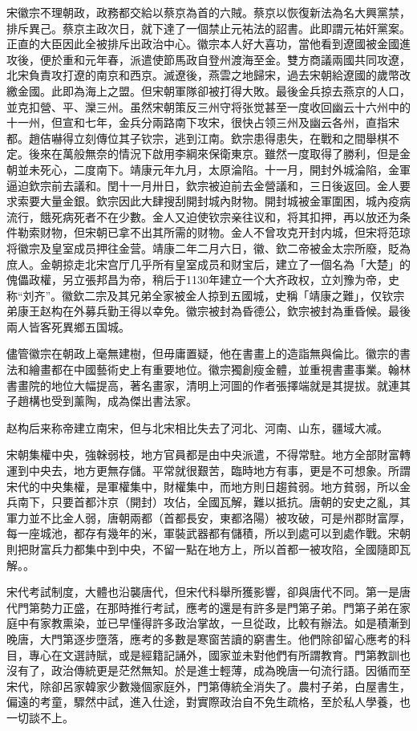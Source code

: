 宋徽宗不理朝政，政務都交給以蔡京為首的六賊。蔡京以恢復新法為名大興黨禁，排斥異己。蔡京主政次日，就下達了一個禁止元祐法的詔書。此即謂元祐奸黨案。正直的大臣因此全被排斥出政治中心。徽宗本人好大喜功，當他看到遼國被金國進攻後，便於重和元年春，派遣使節馬政自登州渡海至金。雙方商議兩國共同攻遼，北宋負責攻打遼的南京和西京。滅遼後，燕雲之地歸宋，過去宋朝給遼國的歲幣改繳金國。此即為海上之盟。但宋朝軍隊卻被打得大敗。最後金兵掠去燕京的人口，並克扣營、平、灤三州。虽然宋朝策反三州守将张觉甚至一度收回幽云十六州中的十一州，但宣和七年，金兵分兩路南下攻宋，很快占领三州及幽云各州，直指宋都。趙佶嚇得立刻傳位其子钦宗，逃到江南。欽宗患得患失，在戰和之間舉棋不定。後來在萬般無奈的情況下啟用李綱來保衛東京。雖然一度取得了勝利，但是金朝並未死心，二度南下。靖康元年九月，太原淪陷。十一月，開封外城淪陷，金軍逼迫欽宗前去議和。閏十一月卅日，欽宗被迫前去金營議和，三日後返回。金人要求索要大量金銀。欽宗因此大肆搜刮開封城內財物。開封城被金軍圍困，城內疫病流行，餓死病死者不在少數。金人又迫使钦宗亲往议和，将其扣押，再以放还为条件勒索财物，但宋朝已拿不出其所需的财物。金人不曾攻克开封内城，但宋将范琼将徽宗及皇室成员押往金营。靖康二年二月六日，徽、欽二帝被金太宗所廢，貶為庶人。金朝掠走北宋宫厅几乎所有皇室成员和财宝后，建立了一個名為「大楚」的傀儡政權，另立張邦昌为帝，稍后于1130年建立一个大齐政权，立刘豫为帝，史称“刘齐”。徽欽二宗及其兄弟全家被金人掠到五國城，史稱「靖康之難」，仅钦宗弟康王赵构在外募兵勤王得以幸免。徽宗被封為昏德公，欽宗被封為重昏候。最後兩人皆客死異鄉五国城。

儘管徽宗在朝政上毫無建樹，但毋庸置疑，他在書畫上的造詣無與倫比。徽宗的書法和繪畫都在中國藝術史上有重要地位。徽宗獨創瘦金體，並重視書畫事業。翰林書畫院的地位大幅提高，著名畫家，清明上河圖的作者張擇端就是其提拔。就連其子趙構也受到薰陶，成為傑出書法家。

赵构后来称帝建立南宋，但与北宋相比失去了河北、河南、山东，疆域大减。

宋朝集權中央，強榦弱枝，地方官員都是由中央派遣，不得常駐。地方全部財富轉運到中央去，地方更無存儲。平常就很艱苦，臨時地方有事，更是不可想象。所謂宋代的中央集權，是軍權集中，財權集中，而地方則日趨貧弱。地方貧弱，所以金兵南下，只要首都汴京（開封）攻佔，全國瓦解，難以抵抗。唐朝的安史之亂，其軍力並不比金人弱，唐朝兩都（首都長安，東都洛陽）被攻破，可是州郡財富厚，每一座城池，都存有幾年的米，軍裝武器都有儲積，所以到處可以到處作戰。宋朝則把財富兵力都集中到中央，不留一點在地方上，所以首都一被攻陷，全國隨即瓦解。。

宋代考試制度，大體也沿襲唐代，但宋代科舉所獲影響，卻與唐代不同。第一是唐代門第勢力正盛，在那時推行考試，應考的還是有許多是門第子弟。門第子弟在家庭中有家教熏染，並已早懂得許多政治掌故，一旦從政，比較有辦法。如是積漸到晚唐，大門第逐步墮落，應考的多數是寒窗苦讀的窮書生。他們除卻留心應考的科目，專心在文選詩賦，或是經籍記誦外，國家並未對他們有所謂教育。門第教訓也沒有了，政治傳統更是茫然無知。於是進士輕薄，成為晚唐一句流行語。因循而至宋代，除卻呂家韓家少數幾個家庭外，門第傳統全消失了。農村子弟，白屋書生，偏遠的考童，驟然中試，進入仕途，對實際政治自不免生疏格，至於私人學養，也一切談不上。

